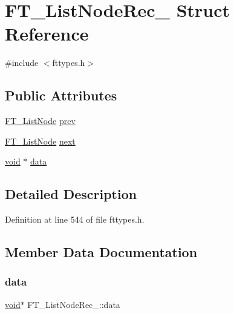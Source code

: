 \hypertarget{struct_f_t___list_node_rec__}{}\section{F\+T\+\_\+\+List\+Node\+Rec\+\_\+ Struct Reference}
\label{struct_f_t___list_node_rec__}


{\ttfamily \#include $<$fttypes.\+h$>$}

\subsection*{Public Attributes}
\begin{DoxyCompactItemize}
\item 
\mbox{\hyperlink{fttypes_8h_a155e4980a42c16fbc221ad40b2b59695}{F\+T\+\_\+\+List\+Node}} \mbox{\hyperlink{struct_f_t___list_node_rec___a41c77950e6940b1b98e04709b705c046}{prev}}
\item 
\mbox{\hyperlink{fttypes_8h_a155e4980a42c16fbc221ad40b2b59695}{F\+T\+\_\+\+List\+Node}} \mbox{\hyperlink{struct_f_t___list_node_rec___a8275962fa8c92b77435cb4fa76251f39}{next}}
\item 
\mbox{\hyperlink{_s_d_l__opengles2__gl2ext_8h_ae5d8fa23ad07c48bb609509eae494c95}{void}} $\ast$ \mbox{\hyperlink{struct_f_t___list_node_rec___ab0202be88f722442a4bec9aeb5f6418f}{data}}
\end{DoxyCompactItemize}


\subsection{Detailed Description}


Definition at line 544 of file fttypes.\+h.



\subsection{Member Data Documentation}
\mbox{\label{struct_f_t___list_node_rec___ab0202be88f722442a4bec9aeb5f6418f}} 
\subsubsection{\texorpdfstring{data}{data}}
{\footnotesize\ttfamily \mbox{\hyperlink{_s_d_l__opengles2__gl2ext_8h_ae5d8fa23ad07c48bb609509eae494c95}{void}}$\ast$ F\+T\+\_\+\+List\+Node\+Rec\+\_\+\+::data}



